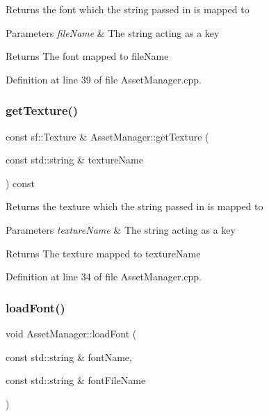 Returns the font which the string passed in is mapped to 
\begin{DoxyParams}{Parameters}
{\em file\+Name} & The string acting as a key \\
\hline
\end{DoxyParams}
\begin{DoxyReturn}{Returns}
The font mapped to file\+Name 
\end{DoxyReturn}


Definition at line 39 of file Asset\+Manager.\+cpp.

\mbox{\label{class_asset_manager_a53ef9625536e0d1dba884971036422b5}} 
\subsubsection{\texorpdfstring{getTexture()}{getTexture()}}
{\footnotesize\ttfamily const sf\+::\+Texture \& Asset\+Manager\+::get\+Texture (\begin{DoxyParamCaption}\item[{const std\+::string \&}]{texture\+Name }\end{DoxyParamCaption}) const}

Returns the texture which the string passed in is mapped to 
\begin{DoxyParams}{Parameters}
{\em texture\+Name} & The string acting as a key \\
\hline
\end{DoxyParams}
\begin{DoxyReturn}{Returns}
The texture mapped to texture\+Name 
\end{DoxyReturn}


Definition at line 34 of file Asset\+Manager.\+cpp.

\mbox{\label{class_asset_manager_a3bfd4095c507124af8cdf16a39f96d6c}} 
\subsubsection{\texorpdfstring{loadFont()}{loadFont()}}
{\footnotesize\ttfamily void Asset\+Manager\+::load\+Font (\begin{DoxyParamCaption}\item[{const std\+::string \&}]{font\+Name,  }\item[{const std\+::string \&}]{font\+File\+Name }\end{DoxyParamCaption})}

